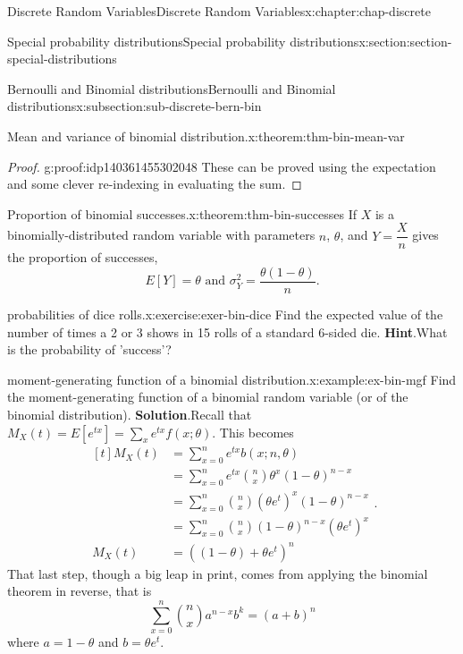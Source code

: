 \documentclass[oneside,10pt,]{book}
\newcommand{\blocktitlefont}{\relax}
\numberwithin{equation}{section}
\newcommand{\amp}{&}
\begin{document}
\begin{chapterptx}{Discrete Random Variables}{}{Discrete Random Variables}{}{}{x:chapter:chap-discrete}
\begin{sectionptx}{Special probability distributions}{}{Special probability distributions}{}{}{x:section:section-special-distributions}
\begin{subsectionptx}{Bernoulli and Binomial distributions}{}{Bernoulli and Binomial distributions}{}{}{x:subsection:sub-discrete-bern-bin}
\begin{theorem}{Mean and variance of binomial distribution.}{}{x:theorem:thm-bin-mean-var}
%
\begin{proof}{}{g:proof:idp140361455302048}
These can be proved using the expectation and some clever re-indexing in evaluating the sum.%
\end{proof}
\end{theorem}
\begin{theorem}{Proportion of binomial successes.}{}{x:theorem:thm-bin-successes}%
If \(X\) is a binomially-distributed random variable with parameters \(n\), \(\theta\), and \(Y = \dfrac{X}{n}\) gives the proportion of successes,%
\begin{equation*}
E[Y] = \theta \text{ and } \sigma_Y^2 =
\dfrac{\theta(1-\theta)}{n}\text{.}
\end{equation*}
%
\end{theorem}
\begin{inlineexercise}{probabilities of dice rolls.}{x:exercise:exer-bin-dice}%
Find the expected value of the number of times a 2 or 3 shows in 15 rolls of a standard 6-sided die.%
\textbf{\blocktitlefont Hint}.\quad{}What is the probability of 'success'?\end{inlineexercise}
\begin{example}{moment-generating function of a binomial distribution.}{x:example:ex-bin-mgf}%
Find the moment-generating function of a binomial random variable (or of the binomial distribution).%
\textbf{\blocktitlefont Solution}.\quad{}Recall that \(\displaystyle M_X(t) = E[e^{tx}] = \sum_x e^{tx} f(x;
\theta)\). This becomes%
\begin{equation*}
\begin{aligned}[t]
M_X(t) \amp = \sum_{x=0}^n e^{tx} b(x; n, \theta)\\
\amp = \sum_{x=0}^n e^{tx} {n \choose x} \theta^x (1-\theta)^{n-x}\\
\amp = \sum_{x=0}^n {n \choose x} \left(\theta e^t\right)^x
(1-\theta)^{n-x}\\
\amp = \sum_{x=0}^n {n \choose x} (1-\theta)^{n-x}\left(\theta
e^t\right)^x\\
M_X(t) \amp = \left((1-\theta) + \theta e^t\right)^n
\end{aligned}\text{.}
\end{equation*}
That last step, though a big leap in print, comes from applying the binomial theorem in reverse, that is%
\begin{equation*}
\sum_{x=0}^n {n \choose
x}a^{n-x} b^k = (a+b)^n
\end{equation*}
where \(a=1-\theta\) and \(b = \theta
e^t\).%
\end{example}

\end{subsectionptx}
\end{sectionptx}
\end{chapterptx}
\end{document}
